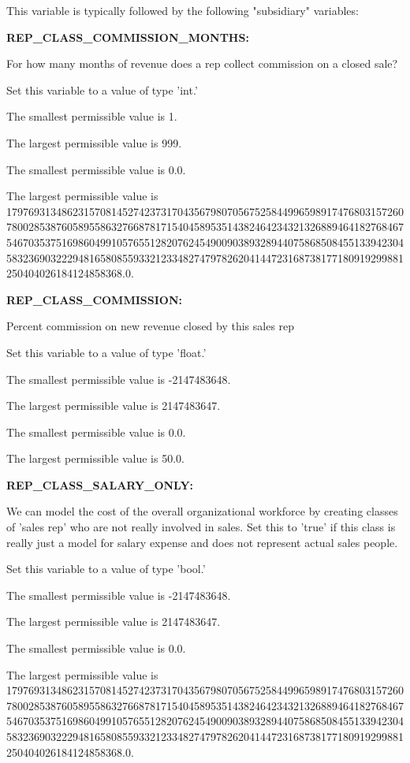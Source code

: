 This variable is typically followed by the following "subsidiary" variables:


\textbf{REP\_CLASS\_COMMISSION\_MONTHS:}


For how many months of revenue does a rep collect commission on a closed sale?

Set this variable to a value of type 'int.'

The smallest permissible value is 1.

The largest permissible value is 999.

The smallest permissible value is 0.0.

The largest permissible value is 179769313486231570814527423731704356798070567525844996598917476803157260780028538760589558632766878171540458953514382464234321326889464182768467546703537516986049910576551282076245490090389328944075868508455133942304583236903222948165808559332123348274797826204144723168738177180919299881250404026184124858368.0.


\textbf{REP\_CLASS\_COMMISSION:}


Percent commission on new revenue closed by this sales rep

Set this variable to a value of type 'float.'

The smallest permissible value is -2147483648.

The largest permissible value is 2147483647.

The smallest permissible value is 0.0.

The largest permissible value is 50.0.


\textbf{REP\_CLASS\_SALARY\_ONLY:}


We can model the cost of the overall organizational workforce by creating classes of 'sales rep' who are not really involved in sales.  Set this to 'true' if this class is really just a model for salary expense and does not represent actual sales people.

Set this variable to a value of type 'bool.'

The smallest permissible value is -2147483648.

The largest permissible value is 2147483647.

The smallest permissible value is 0.0.

The largest permissible value is 179769313486231570814527423731704356798070567525844996598917476803157260780028538760589558632766878171540458953514382464234321326889464182768467546703537516986049910576551282076245490090389328944075868508455133942304583236903222948165808559332123348274797826204144723168738177180919299881250404026184124858368.0.


